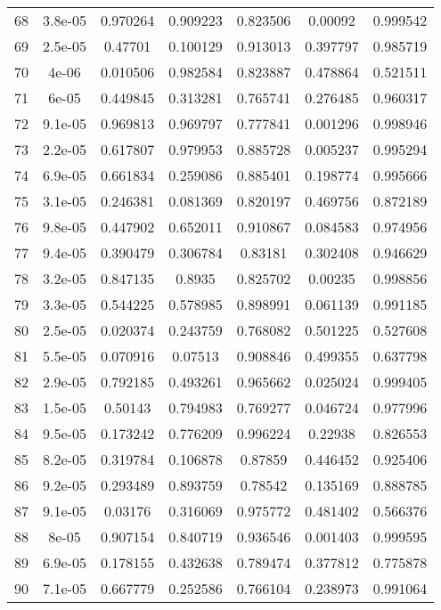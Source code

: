 \begin{table}
\begin{tabular}{c|c|c|c|c|c|c}
68 & 3.8e-05 & 0.970264 & 0.909223 & 0.823506 & 0.00092 & 0.999542\\
69 & 2.5e-05 & 0.47701 & 0.100129 & 0.913013 & 0.397797 & 0.985719\\
70 & 4e-06 & 0.010506 & 0.982584 & 0.823887 & 0.478864 & 0.521511\\
71 & 6e-05 & 0.449845 & 0.313281 & 0.765741 & 0.276485 & 0.960317\\
72 & 9.1e-05 & 0.969813 & 0.969797 & 0.777841 & 0.001296 & 0.998946\\
73 & 2.2e-05 & 0.617807 & 0.979953 & 0.885728 & 0.005237 & 0.995294\\
74 & 6.9e-05 & 0.661834 & 0.259086 & 0.885401 & 0.198774 & 0.995666\\
75 & 3.1e-05 & 0.246381 & 0.081369 & 0.820197 & 0.469756 & 0.872189\\
76 & 9.8e-05 & 0.447902 & 0.652011 & 0.910867 & 0.084583 & 0.974956\\
77 & 9.4e-05 & 0.390479 & 0.306784 & 0.83181 & 0.302408 & 0.946629\\
78 & 3.2e-05 & 0.847135 & 0.8935 & 0.825702 & 0.00235 & 0.998856\\
79 & 3.3e-05 & 0.544225 & 0.578985 & 0.898991 & 0.061139 & 0.991185\\
80 & 2.5e-05 & 0.020374 & 0.243759 & 0.768082 & 0.501225 & 0.527608\\
81 & 5.5e-05 & 0.070916 & 0.07513 & 0.908846 & 0.499355 & 0.637798\\
82 & 2.9e-05 & 0.792185 & 0.493261 & 0.965662 & 0.025024 & 0.999405\\
83 & 1.5e-05 & 0.50143 & 0.794983 & 0.769277 & 0.046724 & 0.977996\\
84 & 9.5e-05 & 0.173242 & 0.776209 & 0.996224 & 0.22938 & 0.826553\\
85 & 8.2e-05 & 0.319784 & 0.106878 & 0.87859 & 0.446452 & 0.925406\\
86 & 9.2e-05 & 0.293489 & 0.893759 & 0.78542 & 0.135169 & 0.888785\\
87 & 9.1e-05 & 0.03176 & 0.316069 & 0.975772 & 0.481402 & 0.566376\\
88 & 8e-05 & 0.907154 & 0.840719 & 0.936546 & 0.001403 & 0.999595\\
89 & 6.9e-05 & 0.178155 & 0.432638 & 0.789474 & 0.377812 & 0.775878\\
90 & 7.1e-05 & 0.667779 & 0.252586 & 0.766104 & 0.238973 & 0.991064\\
\end{tabular}
\end{table}
